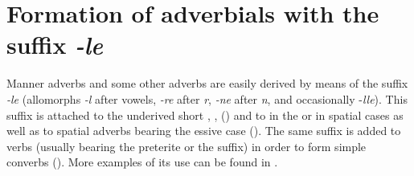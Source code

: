 
\section{Formation of adverbials with the suffix \textit{-le}}
\label{sec:FormationOfAdverbialsWithTheSuffixLe}

Manner adverbs and some other adverbs are easily derived by means of the suffix \textit{-le} (allomorphs \textit{-l} after vowels, \textit{-re} after \textit{r}, \textit{-ne} after \textit{n}, and occasionally -\textit{lle}). This suffix is attached to the underived short  , ,  () and to  in the  or in spatial cases  as well as to spatial adverbs bearing the essive case (). The same suffix is added to verbs (usually bearing the preterite or the  suffix) in order to form simple converbs (). More examples of its use can be found in . 

